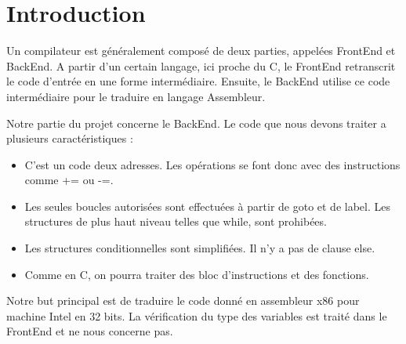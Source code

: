 \vspace{0.5cm}
\section*{Introduction}

\vspace{0.5cm}
Un compilateur est généralement composé de deux parties, appelées FrontEnd et BackEnd. A partir d'un certain langage, ici proche du C, le FrontEnd retranscrit le code d'entrée en une forme intermédiaire. Ensuite, le BackEnd utilise ce code intermédiaire pour le traduire en langage Assembleur. 

\vspace{0.5cm}
Notre partie du projet concerne le BackEnd. 
Le code que nous devons traiter a plusieurs caractéristiques :
\begin{itemize}
\item C'est un code deux adresses. Les opérations se font donc avec des instructions comme += ou -=. 
\item Les seules boucles autorisées sont effectuées à partir de goto et de label. Les structures de plus haut niveau telles que while, sont prohibées.
\item Les structures conditionnelles sont simplifiées. Il n'y a pas de clause else.
\item Comme en C, on pourra traiter des bloc d'instructions et des fonctions.
\end{itemize}

\vspace{0.5cm}
Notre but principal est de traduire le code donné en assembleur x86 pour machine Intel en 32 bits. La vérification du type des variables est traité dans le FrontEnd et ne nous concerne pas.
